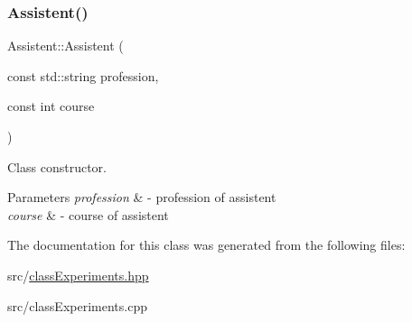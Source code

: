 \subsubsection{\texorpdfstring{Assistent()}{Assistent()}\hspace{0.1cm}{\footnotesize\ttfamily [3/3]}}
{\footnotesize\ttfamily Assistent\+::\+Assistent (\begin{DoxyParamCaption}\item[{const std\+::string}]{profession,  }\item[{const int}]{course }\end{DoxyParamCaption})}



Class constructor. 


\begin{DoxyParams}{Parameters}
{\em profession} & -\/ profession of assistent \\
\hline
{\em course} & -\/ course of assistent \\
\hline
\end{DoxyParams}


The documentation for this class was generated from the following files\+:\begin{DoxyCompactItemize}
\item 
src/\hyperlink{classExperiments_8hpp}{class\+Experiments.\+hpp}\item 
src/class\+Experiments.\+cpp\end{DoxyCompactItemize}
